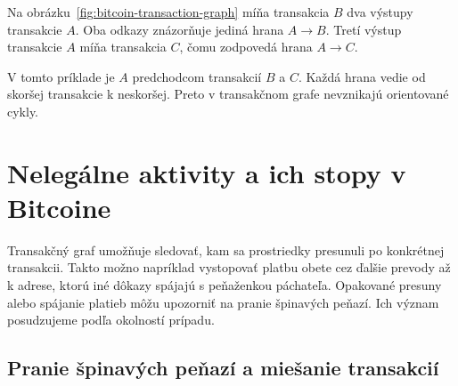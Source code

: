 \begin{center}
  \begin{minipage}{\textwidth}
  Na obrázku~\ref{fig:bitcoin-transaction-graph} míňa transakcia $B$
  dva výstupy transakcie $A$. Oba odkazy znázorňuje jediná hrana
  $A\to B$. Tretí výstup transakcie $A$ míňa transakcia $C$,
  čomu zodpovedá hrana $A\to C$.

  \smallskip
  \centering
  \captionsetup{type=figure}
  \label{fig:bitcoin-transaction-graph}
  \end{minipage}
\end{center}

V tomto príklade je $A$ predchodcom transakcií $B$ a $C$.
Každá hrana vedie od skoršej transakcie k neskoršej. Preto
v transakčnom grafe nevznikajú orientované cykly.

\section{Nelegálne aktivity a ich stopy v Bitcoine}
\label{sec:bitcoin-illicit-activity}

Transakčný graf umožňuje sledovať, kam sa prostriedky presunuli
po konkrétnej transakcii. Takto možno napríklad vystopovať platbu
obete cez ďalšie prevody až k adrese, ktorú iné dôkazy spájajú
s peňaženkou páchateľa. Opakované presuny alebo spájanie platieb
môžu upozorniť na pranie špinavých peňazí. Ich význam posudzujeme
podľa okolností prípadu.

\subsection{Pranie špinavých peňazí a miešanie transakcií}
\label{sec:bitcoin-laundering}


